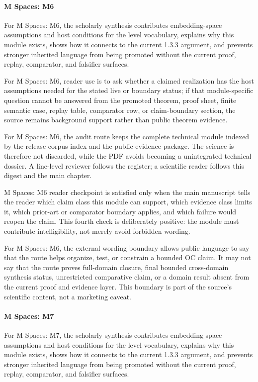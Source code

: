 \paragraph{M Spaces: M6}

For M Spaces: M6, the scholarly synthesis contributes embedding-space assumptions and host conditions for the level vocabulary, explains why this module exists, shows how it connects to the current 1.3.3 argument, and prevents stronger inherited language from being promoted without the current proof, replay, comparator, and falsifier surfaces.


For M Spaces: M6, reader use is to ask whether a claimed realization has the host assumptions needed for the stated live or boundary status; if that module-specific question cannot be answered from the promoted theorem, proof sheet, finite semantic case, replay table, comparator row, or claim-boundary section, the source remains background support rather than public theorem evidence.


For M Spaces: M6, the audit route keeps the complete technical module indexed by the release corpus index and the public evidence package. The science is therefore not discarded, while the PDF avoids becoming a unintegrated technical dossier. A line-level reviewer follows the register; a scientific reader follows this digest and the main chapter.


M Spaces: M6 reader checkpoint is satisfied only when the main manuscript tells the reader which claim class this module can support, which evidence class limits it, which prior-art or comparator boundary applies, and which failure would reopen the claim. This fourth check is deliberately positive: the module must contribute intelligibility, not merely avoid forbidden wording.


For M Spaces: M6, the external wording boundary allows public language to say that the route helps organize, test, or constrain a bounded OC claim. It may not say that the route proves full-domain closure, final bounded cross-domain synthesis status, unrestricted comparative claim, or a domain result absent from the current proof and evidence layer. This boundary is part of the source's scientific content, not a marketing caveat.


\paragraph{M Spaces: M7}

For M Spaces: M7, the scholarly synthesis contributes embedding-space assumptions and host conditions for the level vocabulary, explains why this module exists, shows how it connects to the current 1.3.3 argument, and prevents stronger inherited language from being promoted without the current proof, replay, comparator, and falsifier surfaces.


